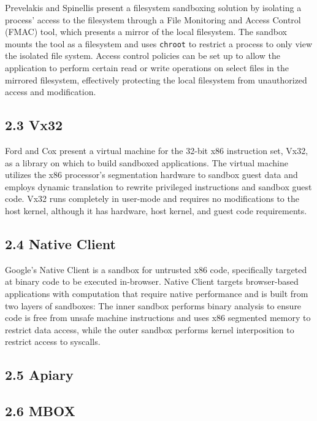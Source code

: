 \documentclass{proc}
\begin{document}
Prevelakis and Spinellis \cite{prevelakis2001fmac} present a filesystem sandboxing solution by isolating a process' access to the filesystem through a File Monitoring and Access Control (FMAC) tool, which presents a mirror of the local filesystem. The sandbox mounts the tool as a filesystem and uses \texttt{chroot} to restrict a process to only view the isolated file system. Access control policies can be set up to allow the application to perform certain read or write operations on select files in the mirrored filesystem, effectively protecting the local filesystem from unauthorized access and modification.

\subsection*{2.3 Vx32}

Ford and Cox \cite{ford2008vx32} present a virtual machine for the 32-bit x86 instruction set, Vx32, as a library on which to build sandboxed applications. The virtual machine utilizes the x86 processor's segmentation hardware to sandbox guest data and employs dynamic translation to rewrite privileged instructions and sandbox guest code. Vx32 runs completely in user-mode and requires no modifications to the host kernel, although it has hardware, host kernel, and guest code requirements.

\subsection*{2.4 Native Client}

Google's Native Client \cite{yee2009native} is a sandbox for untrusted x86 code, specifically targeted at binary code to be executed in-browser. Native Client targets browser-based applications with computation that require native performance and is built from two layers of sandboxes: The inner sandbox performs binary analysis to ensure code is free from unsafe machine instructions and uses x86 segmented memory to restrict data access, while the outer sandbox performs kernel interposition to restrict access to syscalls.

\subsection*{2.5 Apiary}

\subsection*{2.6 MBOX}
\end{document}
